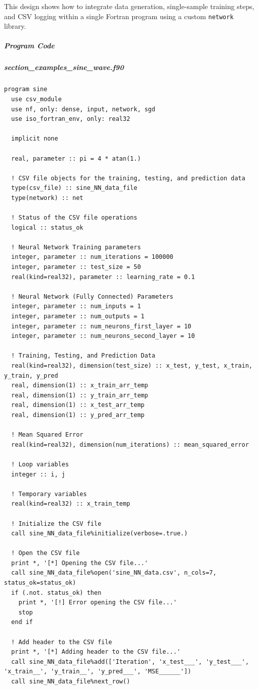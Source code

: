 This design shows how to integrate data generation, single-sample training steps, and CSV logging within a single Fortran program using a custom \texttt{network} library.

\subparagraph{Program Code}

\subparagraph{section\_examples\_sine\_wave.f90}

\begin{verbatim}
program sine
  use csv_module
  use nf, only: dense, input, network, sgd
  use iso_fortran_env, only: real32

  implicit none

  real, parameter :: pi = 4 * atan(1.)
  
  ! CSV file objects for the training, testing, and prediction data
  type(csv_file) :: sine_NN_data_file
  type(network) :: net

  ! Status of the CSV file operations
  logical :: status_ok
 
  ! Neural Network Training parameters
  integer, parameter :: num_iterations = 100000
  integer, parameter :: test_size = 50
  real(kind=real32), parameter :: learning_rate = 0.1
  
  ! Neural Network (Fully Connected) Parameters
  integer, parameter :: num_inputs = 1
  integer, parameter :: num_outputs = 1
  integer, parameter :: num_neurons_first_layer = 10
  integer, parameter :: num_neurons_second_layer = 10

  ! Training, Testing, and Prediction Data
  real(kind=real32), dimension(test_size) :: x_test, y_test, x_train, y_train, y_pred
  real, dimension(1) :: x_train_arr_temp
  real, dimension(1) :: y_train_arr_temp
  real, dimension(1) :: x_test_arr_temp
  real, dimension(1) :: y_pred_arr_temp
  
  ! Mean Squared Error
  real(kind=real32), dimension(num_iterations) :: mean_squared_error

  ! Loop variables
  integer :: i, j

  ! Temporary variables
  real(kind=real32) :: x_train_temp

  ! Initialize the CSV file
  call sine_NN_data_file%initialize(verbose=.true.)
  
  ! Open the CSV file
  print *, '[*] Opening the CSV file...'
  call sine_NN_data_file%open('sine_NN_data.csv', n_cols=7, status_ok=status_ok)
  if (.not. status_ok) then
    print *, '[!] Error opening the CSV file...'
    stop
  end if

  ! Add header to the CSV file
  print *, '[*] Adding header to the CSV file...'
  call sine_NN_data_file%add(['Iteration', 'x_test___', 'y_test___', 'x_train__', 'y_train__', 'y_pred___', 'MSE______'])
  call sine_NN_data_file%next_row()
  

\end{verbatim}
